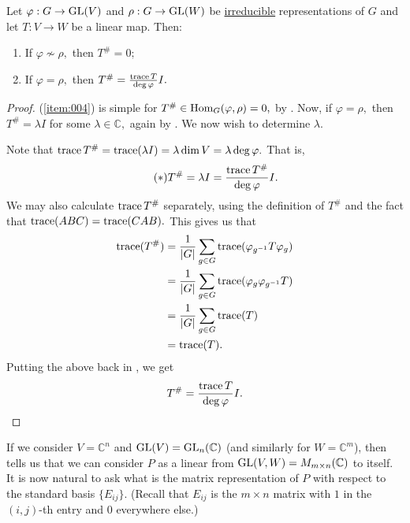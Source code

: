 \begin{prop} \label{prop:hashpropertiesirredrep}
	Let $\varphi : G \to \operatorname{GL}(V)$ and $\rho : G \to \operatorname{GL}(W)$ be \underline{irreducible} representations of $G$ and let $T : V \to W$ be a linear map. Then:
	\begin{enumerate}
		\item \label{item:004} If $\varphi \not\sim \rho,$ then $T^{\#} = 0;$
		\item \label{item:005} If $\varphi = \rho,$ then $T^{\#} = \frac{\operatorname{trace} T}{\deg \varphi}I.$
	\end{enumerate}
\end{prop}
\begin{proof} 
	(\ref{item:004}) is simple for $T^{\#} \in \operatorname{Hom}_{G}(\varphi, \rho) = 0,$ by . Now, if $\varphi = \rho,$ then $T^{\#} = \lambda I$ for some $\lambda \in \mathbb{C},$ again by . We now wish to determine $\lambda.$

	Note that $\operatorname{trace} T^{\#} = \operatorname{trace}(\lambda I) = \lambda \dim V = \lambda \deg \varphi.$ That is,
	\begin{equation} \tag{$*$} \label{eq:001}
		T^{\#} = \lambda I = \dfrac{\operatorname{trace} T^{\#}}{\deg \varphi}I.
	\end{equation}
	We may also calculate $\operatorname{trace} T^{\#}$ separately, using the definition of $T^{\#}$ and the fact that $\operatorname{trace}(ABC) = \operatorname{trace}(CAB).$ This gives us that
	\begin{align*} 
		\operatorname{trace}(T^{\#}) &= \dfrac{1}{{\left\lvert G \right\lvert}}\sum_{g \in G} \operatorname{trace}(\varphi_{g^{-1}}T\varphi_g)\\
		&=\dfrac{1}{{\left\lvert G \right\lvert}}\sum_{g \in G} \operatorname{trace}(\varphi_g\varphi_{g^{-1}}T)\\
		&=\dfrac{1}{{\left\lvert G \right\lvert}}\sum_{g \in G} \operatorname{trace}(T)\\
		&= \operatorname{trace}(T).
	\end{align*}
	Putting the above back in , we get
	\begin{equation*} 
		T^{\#} = \dfrac{\operatorname{trace} T}{\deg \varphi}I. \qedhere
	\end{equation*}
\end{proof}

If we consider $V = \mathbb{C}^n$ and $\operatorname{GL}(V) = \operatorname{GL}_n(\mathbb{C})$ (and similarly for $W = \mathbb{C}^m$), then  tells us that we can consider $P$ as a linear from $\operatorname{GL}(V, W) = M_{m \times n}(\mathbb{C})$ to itself. It is now natural to ask what is the matrix representation of $P$ with respect to the standard basis $\{E_{ij}\}.$ (Recall that $E_{ij}$ is the $m \times n$ matrix with $1$ in the $(i, j)$-th entry and $0$ everywhere else.)

